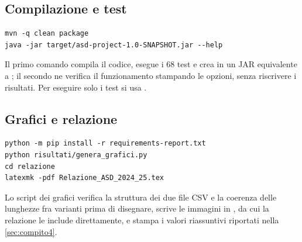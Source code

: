 \subsection{Compilazione e test}

\begin{lstlisting}
mvn -q clean package
java -jar target/asd-project-1.0-SNAPSHOT.jar --help
\end{lstlisting}

Il primo comando compila il codice, esegue i 68 test e crea in
 un JAR equivalente a ; il secondo ne
verifica il funzionamento stampando le opzioni, senza riscrivere i risultati.
Per eseguire solo i test si usa .

\subsection{Grafici e relazione}

\begin{lstlisting}
python -m pip install -r requirements-report.txt
python risultati/genera_grafici.py
cd relazione
latexmk -pdf Relazione_ASD_2024_25.tex
\end{lstlisting}

Lo script dei grafici verifica la struttura dei due file CSV e la coerenza
delle lunghezze fra varianti prima di disegnare, scrive le immagini in
, da cui la relazione le include direttamente, e
stampa i valori riassuntivi riportati nella \cref{sec:compito4}.
